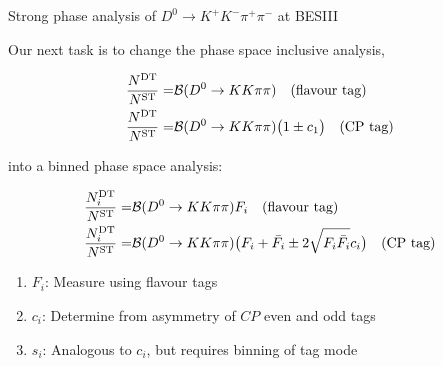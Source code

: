 \documentclass{beamer}
\begin{document}
\begin{frame}{Strong phase analysis of $D^0\to K^+K^-\pi^+\pi^-$ at BESIII}
  \begin{center}
    Our next task is to change the phase space inclusive analysis,
  \end{center}
  \vspace{-0.5cm}
  \begin{align*}
    \frac{N^{\rm DT}}{N^{\rm ST}} =& \mathcal{B}(D^0\to KK\pi\pi)\quad\textnormal{(flavour tag)} \\
    \frac{N^{\rm DT}}{N^{\rm ST}} =& \mathcal{B}(D^0\to KK\pi\pi)\big(1\pm c_1\big)\quad\textnormal{(CP tag)}
  \end{align*}
  \vspace{-1.0cm}
  \begin{center}
    into a binned phase space analysis:
  \end{center}
  \vspace{-0.6cm}
  \begin{align*}
    \frac{N^{\rm DT}_i}{N^{\rm ST}} =& \mathcal{B}(D^0\to KK\pi\pi)F_i\quad\textnormal{(flavour tag)} \\
    \frac{N^{\rm DT}_i}{N^{\rm ST}} =& \mathcal{B}(D^0\to KK\pi\pi)\big(F_i + \bar{F_i} \pm 2\sqrt{F_i\bar{F_i}}c_i\big)\quad\textnormal{(CP tag)}
  \end{align*}
  \vspace{-0.6cm}
  \begin{enumerate}
    \item{$F_i$: Measure using flavour tags}
    \item{$c_i$: Determine from asymmetry of $C\!P$ even and odd tags}
    \item{$s_i$: Analogous to $c_i$, but requires binning of tag mode}
  \end{enumerate}
  \vspace{-7.0cm}
  \begin{center}
  \end{center}
\end{frame}
\end{document}
